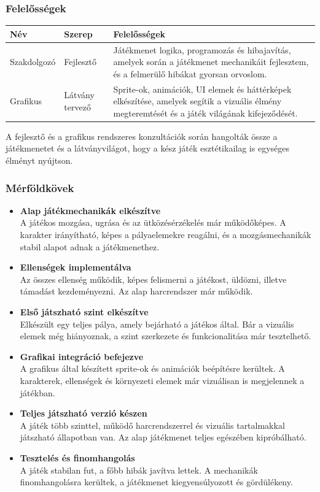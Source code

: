 \documentclass[
]{thesis-ekf}
\theoremstyle{definition}
\theoremstyle{remark}
\begin{document}
\subsubsection{Felelősségek}
\begin{tabular}{|p{3cm}|p{2cm}|p{9cm}|}
	\hline
	Név & Szerep & Felelősségek\\
	\hline
	Szakdolgozó & Fejlesztő &Játékmenet logika, programozás és hibajavítás, amelyek során a játékmenet mechanikáit fejlesztem, és a felmerülő hibákat gyorsan orvoslom. \\
	\hline
	Grafikus & Látvány tervező & Sprite-ok, animációk, UI elemek és háttérképek elkészítése, amelyek segítik a vizuális élmény megteremtését és a játék világának kifejeződését. \\
	\hline
\end{tabular}

A fejlesztő és a grafikus rendszeres konzultációk során hangolták össze a játékmenetet és a látványvilágot, hogy a kész játék esztétikailag is egységes élményt nyújtson.

\subsubsection{Mérföldkövek}

\begin{itemize}
	\item \textbf{Alap játékmechanikák elkészítve} \\
	A játékos mozgása, ugrása és az ütközésérzékelés már működőképes. A karakter irányítható, képes a pályaelemekre reagálni, és a mozgásmechanikák stabil alapot adnak a játékmenethez.
	\item \textbf{Ellenségek implementálva}\\
	Az összes ellenség működik, képes felismerni a játékost, üldözni, illetve támadást kezdeményezni. Az alap harcrendszer már működik.
	\item \textbf{Első játszható szint elkészítve}\\
	Elkészült egy teljes pálya, amely bejárható a játékos által. Bár a vizuális elemek még hiányoznak, a szint szerkezete és funkcionalitása már tesztelhető.
	\item \textbf{Grafikai integráció befejezve}\\
	A grafikus által készített sprite-ok és animációk beépítésre kerültek. A karakterek, ellenségek és környezeti elemek már vizuálisan is megjelennek a játékban.
	\item \textbf{Teljes játszható verzió készen}\\
	A játék több szinttel, működő harcrendszerrel és vizuális tartalmakkal játszható állapotban van. Az alap játékmenet teljes egészében kipróbálható.
	\item \textbf{Tesztelés és finomhangolás}\\
	A játék stabilan fut, a főbb hibák javítva lettek. A mechanikák finomhangolásra kerültek, a játékmenet kiegyensúlyozott és gördülékeny.
\end{itemize}
\end{document}
